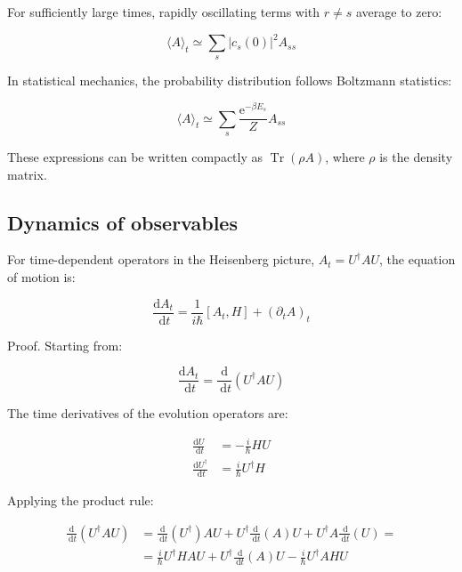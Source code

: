 \documentclass[italian]{HKNdocument}
\begin{document}
For sufficiently large times, rapidly oscillating terms with $r \neq s$ average to zero:

\begin{equation}
\langle A\rangle_{t} \simeq \sum_{s}\left|c_{s}(0)\right|^{2} A_{s s} \label{eq:10.36}
\end{equation}

In statistical mechanics, the probability distribution follows Boltzmann statistics:

\begin{equation}
\langle A\rangle_{t} \simeq \sum_{s} \frac{\mathrm{e}^{-\beta E_{s}}}{Z} A_{s s} \label{eq:10.37}
\end{equation}

These expressions can be written compactly as $\operatorname{Tr}(\rho A)$, where $\rho$ is the density matrix.

\subsection{Dynamics of observables}
For time-dependent operators in the Heisenberg picture, $A_t = U^\dagger A U$, the equation of motion is:

\begin{equation}
\frac{\mathrm{d} A_{t}}{\mathrm{~d} t}=\frac{1}{i \hbar}\left[A_{t}, H\right]+\left(\partial_{t} A\right)_{t} \label{eq:10.38}
\end{equation}


Proof. Starting from:

\begin{equation}
\frac{\mathrm{d} A_{t}}{\mathrm{~d} t}=\frac{\mathrm{d}}{\mathrm{~d} t}\left(U^{\dagger} A U\right) \label{eq:10.39}
\end{equation}

The time derivatives of the evolution operators are:

\begin{align}
\frac{\mathrm{d} U}{\mathrm{~d} t} & =-\frac{i}{\hbar} H U \\
\frac{\mathrm{d} U^{\dagger}}{\mathrm{~d} t} & =\frac{i}{\hbar} U^{\dagger} H \label{eq:10.40}
\end{align}

Applying the product rule:

\begin{align}
\frac{\mathrm{d}}{\mathrm{~d} t}\left(U^{\dagger} A U\right) & =\frac{\mathrm{d}}{\mathrm{~d} t}\left(U^{\dagger}\right) A U+U^{\dagger} \frac{\mathrm{d}}{\mathrm{~d} t}(A) U+U^{\dagger} A \frac{\mathrm{~d}}{\mathrm{~d} t}(U)=  \label{eq:10.41}\\
& =\frac{i}{\hbar} U^{\dagger} H A U+U^{\dagger} \frac{\mathrm{~d}}{\mathrm{~d} t}(A) U-\frac{i}{\hbar} U^{\dagger} A H U
\end{align}
\end{document}
